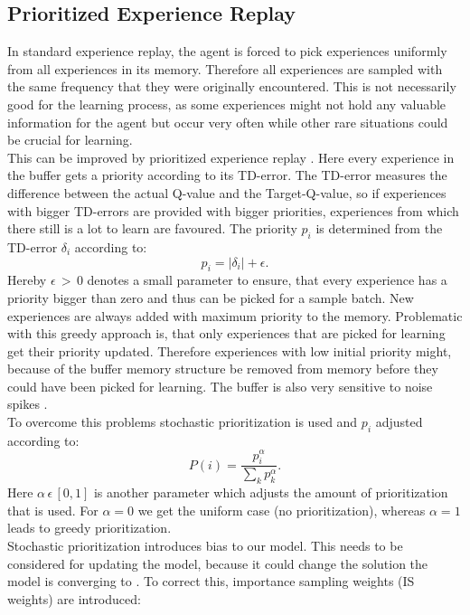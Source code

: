 \subsection{Prioritized Experience Replay\anna}
In standard experience replay, the agent is forced to pick experiences uniformly from all experiences in its memory. Therefore all experiences are sampled with the same frequency that they were originally encountered.
This is not necessarily good for the learning process, as some experiences might not hold any valuable information for the agent but occur very often while other rare situations could be crucial for learning. \\
This can be improved by prioritized experience replay \cite{DBLP:journals/corr/SchaulQAS15}. Here every experience in the buffer gets a priority according to its TD-error.
The TD-error measures the difference between the actual Q-value and the Target-Q-value, so if experiences with bigger TD-errors are provided with bigger priorities, experiences from which there still is a lot to learn are favoured.
The priority $p_i$ is determined from the TD-error $\delta_i$ according to:
\begin{equation}
p_{i}=\left|\delta_{i}\right|+\epsilon.
\end{equation}
Hereby $\epsilon\,>\,0$ denotes a small parameter to ensure, that every experience has a priority bigger than zero and thus can be picked for a sample batch.
New experiences are always added with maximum priority to the memory.
Problematic with this greedy approach is, that only experiences that are picked for learning get their priority updated. Therefore experiences with low initial priority might, because of the buffer memory structure be removed from memory before they could have been picked for learning. The buffer is also very sensitive to noise spikes \cite{DBLP:journals/corr/SchaulQAS15}. \\
To overcome this problems stochastic prioritization is used and $p_i$ adjusted according to:
\begin{equation}
P(i)=\frac{p_{i}^{\alpha}}{\sum_{k} p_{k}^{\alpha}}.
\end{equation}
Here $\alpha\,\epsilon\,[0,1]$ is another parameter which adjusts the amount of prioritization that is used. For $\alpha=0$ we get the uniform case (no prioritization), whereas $\alpha=1$ leads to greedy prioritization. \\
Stochastic prioritization introduces bias to our model. This needs to be considered for updating the model, because it could change the solution the model is converging to \cite{DBLP:journals/corr/SchaulQAS15}. To correct this, importance sampling weights (IS weights) are introduced: 
